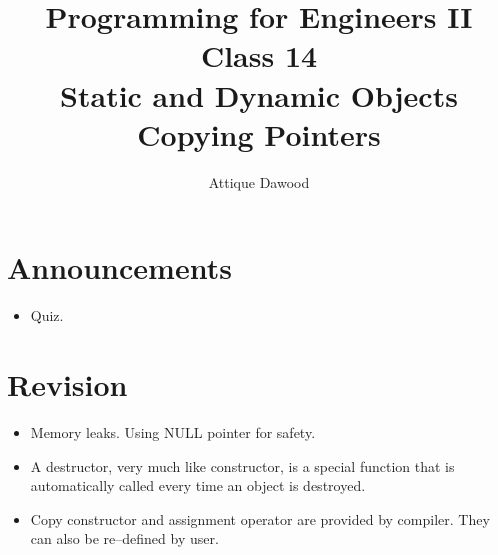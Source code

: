 \documentclass[12pt,a4paper]{article}
\title{\vspace{-2cm}Programming for Engineers II\\Class 14\\Static and Dynamic Objects\\Copying Pointers}
\author{Attique Dawood}
\begin{document}
\maketitle
\section{Announcements}
\begin{itemize}
\item Quiz.
\end{itemize}
\section{Revision}
\begin{itemize}
\item Memory leaks. Using NULL pointer for safety.
\item A destructor, very much like constructor, is a special function that is automatically called every time an object is destroyed.
\item Copy constructor and assignment operator are provided by compiler. They can also be re--defined by user.
\end{itemize}
\end{document}
